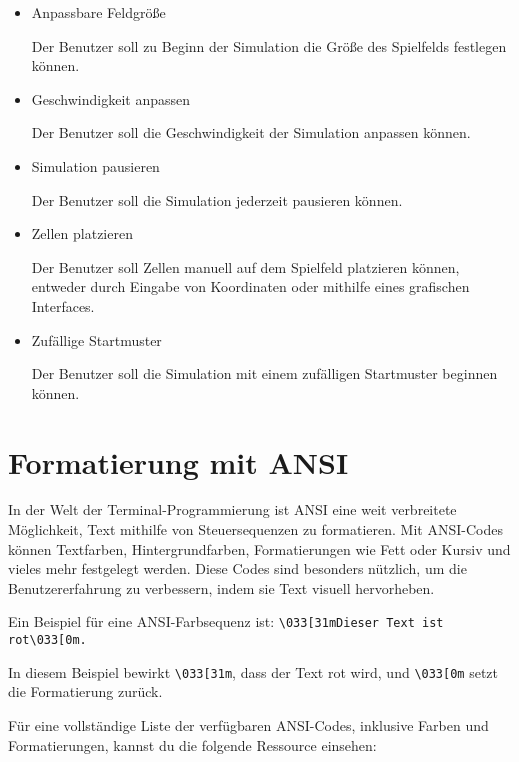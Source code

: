 \documentclass[12pt,a4paper]{article}
\begin{document}
\begin{itemize}
    \item Anpassbare Feldgröße\par
    Der Benutzer soll zu Beginn der Simulation die Größe des Spielfelds festlegen können.

    \item Geschwindigkeit anpassen\par 
    Der Benutzer soll die Geschwindigkeit der Simulation anpassen können.
    
    \item Simulation pausieren\par
    Der Benutzer soll die Simulation jederzeit pausieren können.
    
    \item Zellen platzieren\par
    Der Benutzer soll Zellen manuell auf dem Spielfeld platzieren können, entweder durch Eingabe von Koordinaten oder mithilfe eines grafischen Interfaces.

    \item Zufällige Startmuster\par
    Der Benutzer soll die Simulation mit einem zufälligen Startmuster beginnen können.
\end{itemize}

\newpage
{}
\setcounter{section}{0}
\renewcommand{\thesection}{\Roman{section}}

\section{Formatierung mit ANSI}

In der Welt der Terminal-Programmierung ist ANSI eine weit verbreitete Möglichkeit, Text mithilfe von Steuersequenzen zu formatieren. Mit ANSI-Codes können Textfarben, Hintergrundfarben, Formatierungen wie Fett oder Kursiv und vieles mehr festgelegt werden. Diese Codes sind besonders nützlich, um die Benutzererfahrung zu verbessern, indem sie Text visuell hervorheben.

Ein Beispiel für eine ANSI-Farbsequenz ist:
\texttt{\textbackslash033[31mDieser Text ist rot\textbackslash033[0m.}

In diesem Beispiel bewirkt \texttt{\textbackslash033[31m}, dass der Text rot wird, und \texttt{\textbackslash033[0m} setzt die Formatierung zurück.

Für eine vollständige Liste der verfügbaren ANSI-Codes, inklusive Farben und Formatierungen, kannst du die folgende Ressource einsehen:
\end{document}
